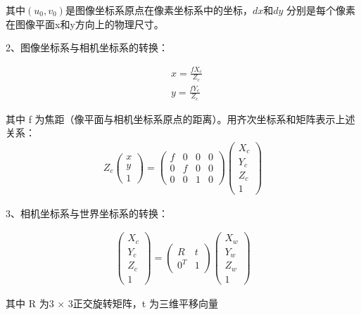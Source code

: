 其中$(u_0, v_0)$是图像坐标系原点在像素坐标系中的坐标，$dx$和$dy$ 分别是每个像素在图像平面x和y方向上的物理尺寸。

2、图像坐标系与相机坐标系的转换：

\begin{align}
& x = \frac{fX_c}{Z_c}  \\
& y = \frac{fY_c}{Z_c}
\end{align}

其中 f 为焦距（像平面与相机坐标系原点的距离）。用齐次坐标系和矩阵表示上述关系：
\begin{align}
Z_c\begin{pmatrix}
x \\ y \\ 1
\end{pmatrix}
=
\begin{pmatrix}
f & 0 & 0 & 0\\
0 & f & 0 & 0\\
0 & 0 & 1 & 0
\end{pmatrix}
\begin{pmatrix}
X_c \\ Y_c \\ Z_c \\ 1
\end{pmatrix}
\end{align}

3、相机坐标系与世界坐标系的转换：

\begin{align}
\begin{pmatrix}
X_c \\ Y_c \\ Z_c \\ 1
\end{pmatrix}
=
\begin{pmatrix}
R & t \\
0^T & 1
\end{pmatrix}
\begin{pmatrix}
X_w \\ Y_w \\ Z_w \\ 1
\end{pmatrix}
\end{align}

其中 R 为3 $\times$ 3正交旋转矩阵，t 为三维平移向量

